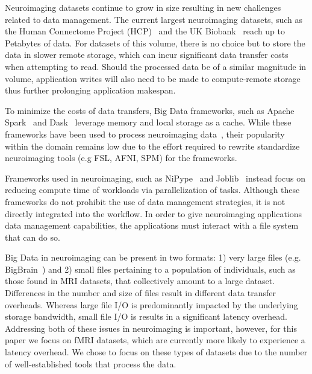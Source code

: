     Neuroimaging datasets continue to grow in size resulting in new challenges
    related to data management. The current largest neuroimaging datasets, such
    as the Human Connectome Project (HCP)~\cite{HCP} and the UK
    Biobank~\cite{ukbiobank} reach up to Petabytes of data. For datasets of this
    volume, there is no choice but to store the data in slower remote storage,
    which can incur significant data transfer costs when attempting to read.
    Should the processed data be of a similar magnitude in volume, application
    writes will also need to be made to compute-remote storage thus further
    prolonging application makespan. 

    To minimize the costs of data transfers, Big Data frameworks, such as Apache
    Spark~\cite{zaharia2016apache} and Dask~\cite{rocklin2015dask} leverage
    memory and local storage as a cache. While these frameworks have been used
    to process neuroimaging data~\cite{rokem2021pan,thunder,boubela2016big}, their popularity within the
    domain remains low due to the effort required to rewrite standardize
    neuroimaging tools (e.g FSL, AFNI, SPM) for the frameworks. 
    
    Frameworks used in neuroimaging, such as NiPype~\cite{nipype} and
    Joblib~\cite{joblib} instead focus on reducing compute time of workloads via parallelization of tasks.
    Although these
    frameworks do not prohibit the use of data management strategies, it is not
    directly integrated into the workflow. In order to give neuroimaging
    applications data management capabilities, the applications must interact
    with a file system that can do so.

    Big Data in neuroimaging can be present in two formats: 1) very large files (e.g. BigBrain~\cite{amunts2013bigbrain}) and
    2) small files pertaining to a population of individuals, such as those found in MRI datasets, that collectively
    amount to a large dataset. Differences in the number and size of files result in different data transfer overheads.
    Whereas large file I/O is predominantly impacted by the underlying storage bandwidth, small file I/O is results in a
    significant latency overhead. Addressing both of these issues in neuroimaging is important, however, for this paper
    we focus on fMRI datasets, which are currently more likely to experience a latency overhead. We chose to focus
    on these types of datasets due to the number of well-established tools that process the data.

